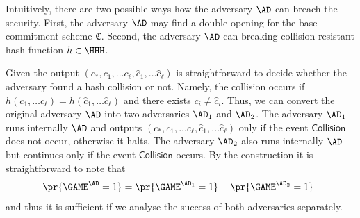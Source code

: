 \documentclass{crypto-exercise}
\newcommand{\CS}{\mathfrak{C}}
\newcommand{\COLL}{\mathsf{Collision}}
\begin{document}
\begin{solution}
Intuitively, there are two possible ways how the adversary $\AD$ can breach the security. First, the adversary $\AD$ may find a double opening for the base commitment scheme $\CS$. Second, the  adversary $\AD$ can breaking collision resistant hash function $h \in \HHH$. 

Given the output $(c_*, c_1,\ldots c_\ell, \hat{c}_1,\ldots \hat{c}_\ell)$ is straightforward to decide whether the adversary found a hash collision or not. Namely, the collision occurs if $h(c_1,\ldots c_\ell)=h(\hat{c}_1,\ldots \hat{c}_\ell)$ and there exists $c_i\neq\hat{c}_i$. Thus, we can convert the original adversary $\AD$ into two adversaries $\AD_1$ and $\AD_2$. The adversary $\AD_1$ runs internally $\AD$ and outputs $(c_*, c_1,\ldots c_\ell, \hat{c}_1,\ldots \hat{c}_\ell)$ only if the event $\COLL$ does not occur, otherwise it halts. The adversary $\AD_2$ also runs internally $\AD$ but continues only if the event $\COLL$ occurs.  By the construction it is straightforward to note that 
\begin{align*}
\pr{\GAME^\AD=1}=\pr{\GAME^{\AD_1}=1}+\pr{\GAME^{\AD_2}=1}\enspace
\end{align*}   
and thus it is sufficient if we analyse the success of both adversaries separately. 


\end{solution}
\end{document}
